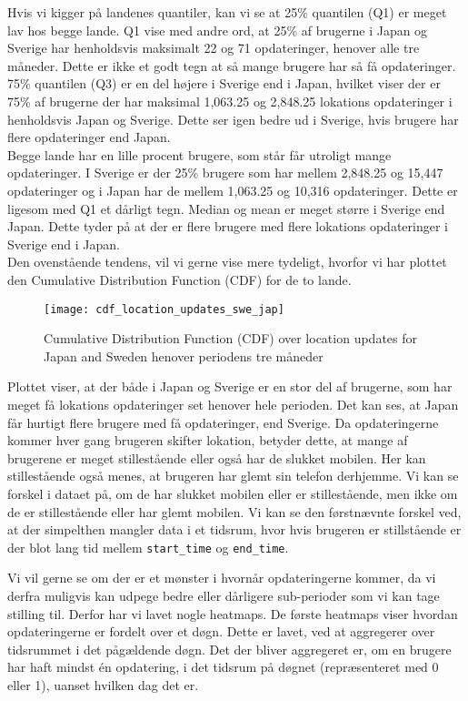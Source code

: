 Hvis vi kigger på landenes quantiler, kan vi se at 25\% quantilen (Q1) er meget lav hos begge lande. Q1 vise med andre ord, at 25\% af brugerne i Japan og Sverige har henholdsvis maksimalt 22 og 71 opdateringer, henover alle tre måneder. Dette er ikke et godt tegn at så mange brugere har så få opdateringer. 75\% quantilen (Q3) er en del højere i Sverige end i Japan, hvilket viser der er 75\% af brugerne der har maksimal 1,063.25 og 2,848.25 lokations opdateringer i henholdsvis Japan og Sverige. Dette ser igen bedre ud i Sverige, hvis brugere har flere opdateringer end Japan. \\ 

Begge lande har en lille procent brugere, som står får utroligt mange opdateringer. I Sverige er der 25\% brugere som har mellem 2,848.25 og 15,447 opdateringer og i Japan har de mellem 1,063.25 og 10,316 opdateringer. Dette er ligesom med Q1 et dårligt tegn. 
Median og mean er meget større i Sverige end Japan. Dette tyder på at der er flere brugere med flere lokations opdateringer i Sverige end i Japan. \\


Den ovenstående tendens, vil vi gerne vise mere tydeligt, hvorfor vi har plottet den Cumulative Distribution Function (CDF) for de to lande. 
\begin{figure}[H]
    \hspace*{-1.0cm}
    \centering
    \texttt{[image: cdf\_location\_updates\_swe\_jap]}
    \caption{Cumulative Distribution Function (CDF) over location updates for Japan and Sweden henover periodens tre måneder}
    \label{fig:country_cdf}
\end{figure}

Plottet viser, at der både i Japan og Sverige er en stor del af brugerne, som har meget få lokations opdateringer set henover hele perioden. Det kan ses, at Japan får hurtigt flere brugere med få opdateringer, end Sverige. 
Da opdateringerne kommer hver gang brugeren skifter lokation, betyder dette, at mange af brugerene er meget stillestående eller også har de slukket mobilen. Her kan stillestående også menes, at brugeren har glemt sin telefon derhjemme. Vi kan se forskel i dataet på, om de har slukket mobilen eller er stillestående, men ikke om de er stillestående eller har glemt mobilen. Vi kan se den førstnævnte forskel ved, at der simpelthen mangler data i et tidsrum, hvor hvis brugeren er stillstående er der blot lang tid mellem \texttt{start\_time} og \texttt{end\_time}. 

Vi vil gerne se om der er et mønster i hvornår opdateringerne kommer, da vi derfra muligvis kan udpege bedre eller dårligere sub-perioder som vi kan tage stilling til. Derfor har vi lavet nogle heatmaps. 
De første heatmaps viser hvordan opdateringerne er fordelt over et døgn. Dette er lavet, ved at aggregerer over tidsrummet i det pågældende døgn. Det der bliver aggregeret er, om en brugere har haft mindst én opdatering, i det tidsrum på døgnet (repræsenteret med 0 eller 1), uanset hvilken dag det er.

